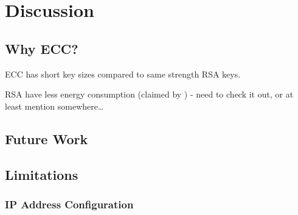 \chapter{Discussion}
\label{ch:discussion}
\acresetall


\section{Why ECC?}
ECC has short key sizes compared to same strength RSA keys.

RSA have less energy consumption (claimed by \cite{hosseinisecure}) - need to
check it out, or at least mention somewhere\ldots

\section{Future Work}

\section{Limitations}

\subsection{IP Address Configuration}\label{ip_address_conf}